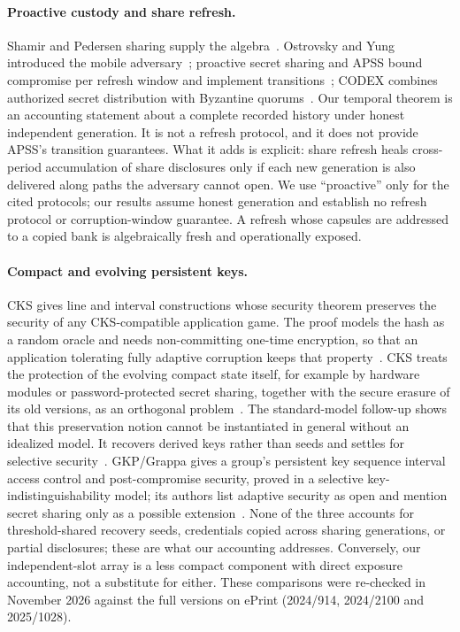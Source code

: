 \documentclass[pdflatex,sn-mathphys-num]{sn-jnl}%
\theoremstyle{plain}
\theoremstyle{definition}
\begin{document}
\paragraph{Proactive custody and share refresh.}
Shamir and Pedersen sharing supply the algebra~\cite{shamir1979,pedersen1991}. Ostrovsky and Yung introduced the mobile adversary~\cite{ostrovsky1991}; proactive secret sharing and APSS bound compromise per refresh window and implement transitions~\cite{herzberg1995,zhou2005}; CODEX combines authorized secret distribution with Byzantine quorums~\cite{marsh2004}. Our temporal theorem is an accounting statement about a complete recorded history under honest independent generation. It is not a refresh protocol, and it does not provide APSS's transition guarantees. What it adds is explicit: share refresh heals cross-period accumulation of share disclosures only if each new generation is also delivered along paths the adversary cannot open. We use ``proactive'' only for the cited protocols; our results assume honest generation and establish no refresh protocol or corruption-window guarantee. A refresh whose capsules are addressed to a copied bank is algebraically fresh and operationally exposed.

\paragraph{Compact and evolving persistent keys.}
CKS gives line and interval constructions whose security theorem preserves the security of any CKS-compatible application game. The proof models the hash as a random oracle and needs non-committing one-time encryption, so that an application tolerating fully adaptive corruption keeps that property~\cite[Thm.~3]{dodis2024}. CKS treats the protection of the evolving compact state itself, for example by hardware modules or password-protected secret sharing, together with the secure erasure of its old versions, as an orthogonal problem~\cite[Sect.~1]{dodis2024}. The standard-model follow-up shows that this preservation notion cannot be instantiated in general without an idealized model. It recovers derived keys rather than seeds and settles for selective security~\cite[Sects.~1.1 and~2.3]{dodisstandard2024}. GKP/Grappa gives a group's persistent key sequence interval access control and post-compromise security, proved in a selective key-indistinguishability model; its authors list adaptive security as open and mention secret sharing only as a possible extension~\cite[Sects.~1 and~7.1]{backendal2026}. None of the three accounts for threshold-shared recovery seeds, credentials copied across sharing generations, or partial disclosures; these are what our accounting addresses. Conversely, our independent-slot array is a less compact component with direct exposure accounting, not a substitute for either. These comparisons were re-checked in November 2026 against the full versions on ePrint (2024/914, 2024/2100 and 2025/1028).
\end{document}
